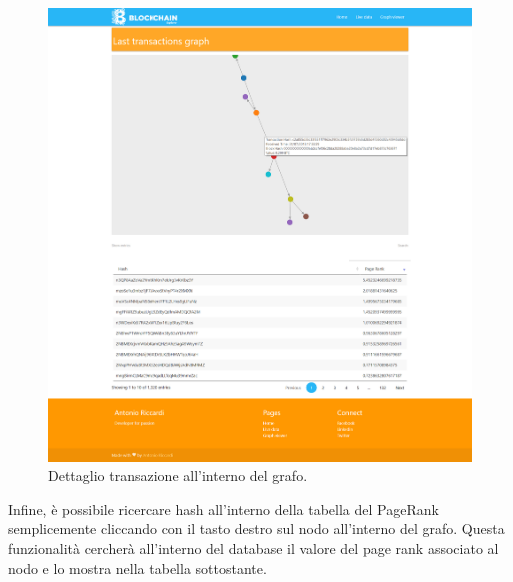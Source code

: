 \begin{figure}[H]
	\centering
	\includegraphics[width=\textwidth, height=0.70\textheight]{images/lastGraph-2.jpg}
	\caption{Dettaglio transazione all'interno del grafo.}
	\label{fig:graph2BE}
\end{figure}
Infine, è possibile ricercare hash all'interno della tabella del PageRank semplicemente cliccando con il tasto destro sul nodo all'interno del grafo. Questa funzionalità cercherà all'interno del database il valore del page rank associato al nodo e lo mostra nella tabella sottostante.

